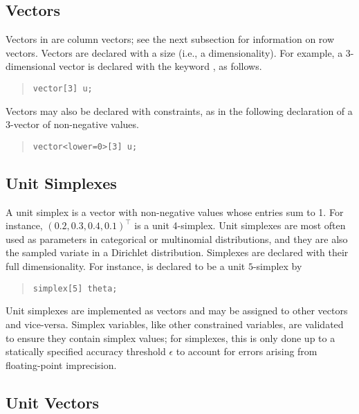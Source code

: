 \subsection{Vectors}

Vectors in \Stan are column vectors; see the next subsection for
information on row vectors.  Vectors are declared with a size (i.e., a
dimensionality).  For example, a 3-dimensional vector is declared with
the keyword , as follows.
%
\begin{quote}
\begin{Verbatim}[fontsize=\small]
vector[3] u;
\end{Verbatim}
\end{quote}
%
Vectors may also be declared with constraints, as in the following
declaration of a 3-vector of non-negative values.
%
\begin{quote}
\begin{Verbatim}[fontsize=\small]
vector<lower=0>[3] u;
\end{Verbatim}
\end{quote}
%

\subsection{Unit Simplexes}

A unit simplex is a vector with non-negative values whose entries sum
to 1.  For instance, $(0.2,0.3,0.4,0.1)^{\top}$ is a unit 4-simplex.
Unit simplexes are most often used as parameters in categorical
or multinomial distributions, and they are also the sampled variate in
a Dirichlet distribution.  Simplexes are declared with their full
dimensionality.  For instance,  is declared to
be a unit $5$-simplex by
%
\begin{quote}
\begin{Verbatim} 
simplex[5] theta;
\end{Verbatim}
\end{quote}
% 

Unit simplexes are implemented as vectors and may be assigned to other
vectors and vice-versa.  Simplex variables, like other constrained
variables, are validated to ensure they contain simplex values; for
simplexes, this is only done up to a statically specified accuracy
threshold $\epsilon$ to account for errors arising from floating-point
imprecision.

\subsection{Unit Vectors}

